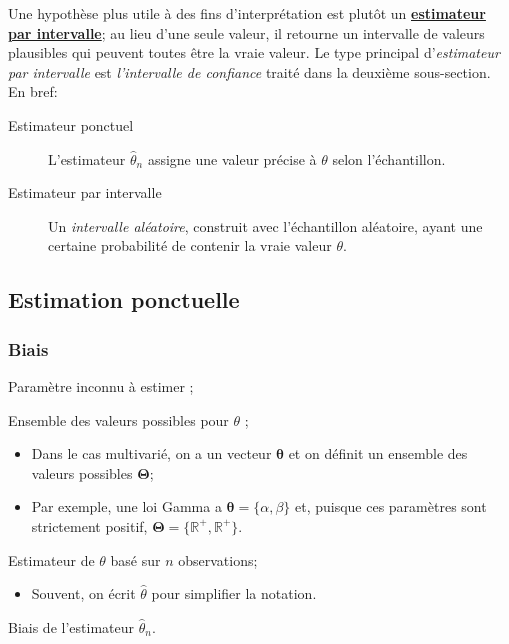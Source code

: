 \documentclass[10pt, french]{article}
\begin{document}
\begin{multicols*}{2}
Une hypothèse plus utile à des fins d'interprétation est plutôt un \textbf{\hyperref[sec:int-estimation]{estimateur par intervalle}}; au lieu d'une seule valeur, il retourne un intervalle de valeurs plausibles qui peuvent toutes être la vraie valeur. 
Le type principal d'\textit{estimateur par intervalle} est \textit{l'intervalle de confiance} traité dans la deuxième sous-section.\\

En bref:
\begin{description}
	\item[Estimateur ponctuel]	L'estimateur $\hat{\theta}_{n}$ assigne une valeur précise à $\theta$ selon l'échantillon.
	\item[Estimateur par intervalle]	Un \textit{intervalle aléatoire}, construit avec l'échantillon aléatoire, ayant une certaine probabilité de contenir la vraie valeur $\theta$.
\end{description}


\subsection{Estimation ponctuelle}

\subsubsection{Biais}
\begin{distributions}[Notation]
\begin{description}[font = \normalfont]
	\item[$\theta$]	Paramètre inconnu à estimer ;
	\item[$\Theta$]	Ensemble des valeurs possibles pour $\theta$ ;
		\begin{itemize}
		\item	Dans le cas multivarié, on a un vecteur $\bm{\theta}$ et on définit un ensemble des valeurs possibles $\bm{\Theta}$;
		\item	Par exemple, une loi Gamma a $\bm{\theta}	=	\{\alpha, \beta\}$ et, puisque ces paramètres sont strictement positif, $\bm{\Theta}	=	\{\mathbb{R}^{+}, \mathbb{R}^{+}\}$.
		\end{itemize}
	\item[$\hat{\theta}_{n}$]	Estimateur de $\theta$ basé sur $n$ observations;
		\begin{itemize}[leftmargin = *]
		\item	Souvent, on écrit $\hat{\theta}$ pour simplifier la notation.
		\end{itemize}
	\item[$\text{B}(\hat{\theta}_{n})$]	Biais de l'estimateur $\hat{\theta}_{n}$.
\end{description}
\end{distributions}


\end{multicols*}
\end{document}
